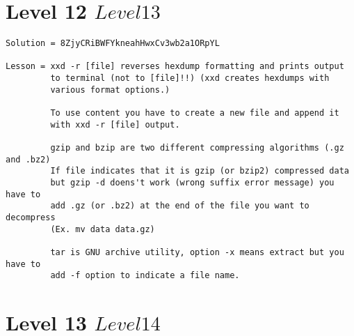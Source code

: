\documentclass[a4paper]{report}
\begin{document}
\section{Level 12 \rightarrow $ Level 13 $}

\begin{verbatim}
Solution = 8ZjyCRiBWFYkneahHwxCv3wb2a1ORpYL

Lesson = xxd -r [file] reverses hexdump formatting and prints output 
		 to terminal (not to [file]!!) (xxd creates hexdumps with 
		 various format options.)
	 
	 	 To use content you have to create a new file and append it 
	 	 with xxd -r [file] output. 

	 	 gzip and bzip are two different compressing algorithms (.gz and .bz2) 
	 	 If file indicates that it is gzip (or bzip2) compressed data 
	 	 but gzip -d doens't work (wrong suffix error message) you have to 
	 	 add .gz (or .bz2) at the end of the file you want to decompress 
	 	 (Ex. mv data data.gz)
	 	 
	 	 tar is GNU archive utility, option -x means extract but you have to 
	 	 add -f option to indicate a file name.
\end{verbatim}


\section{Level 13 \rightarrow $ Level 14 $}
\end{document}
